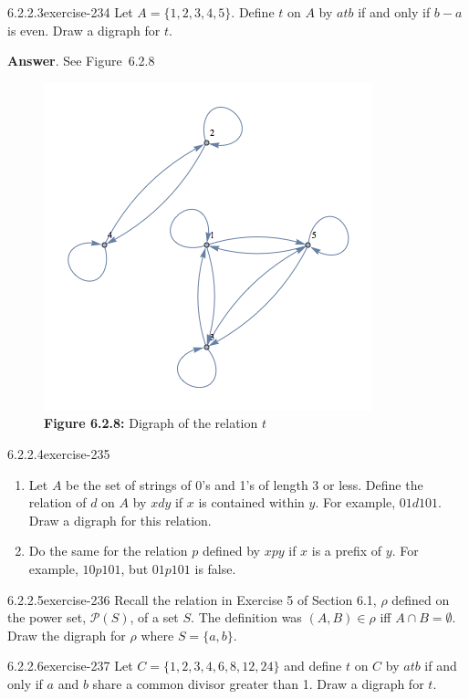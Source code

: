 \documentclass[twoside,10pt,]{book}
\numberwithin{equation}{section}
\begin{document}
\begin{divisionsolution}{6.2.2.3}{}{exercise-234}%
\hypertarget{p-1994}{}%
Let \(A=\{1,2,3,4,5\}\). Define \(t\) on \(A\) by \(a t b\) if and only if \(b - a\) is even. Draw a digraph for \(t\).%
\par\smallskip%
\noindent\textbf{Answer}.\quad%
\hypertarget{p-1995}{}%
See Figure~6.2.8%
\begin{figure}
\centering
\includegraphics[width=0.6\linewidth]{images/fig-13-1-1.png}
\caption*{\textbf{Figure 6.2.8:} Digraph of the relation \(t\)}
\end{figure}
\end{divisionsolution}%
\begin{divisionsolution}{6.2.2.4}{}{exercise-235}%
\hypertarget{p-1996}{}%
\leavevmode%
\begin{enumerate}[label=(\alph*)]
\item\hypertarget{li-1059}{}Let \(A\) be the set of strings of 0's and 1's of length 3 or less. Define the relation of \(d\) on \(A\) by \(x d y\) if \(x\) is contained within \(y\). For example, \(01 d 101\). Draw a digraph for this relation.%
\item\hypertarget{li-1060}{}Do the same for the relation \(p\) defined by \(x p y\) if \(x\) is a prefix of \(y\). For example, \(10 p 101\), but \(01 p 101\) is false.%
\end{enumerate}
%
\end{divisionsolution}%
\begin{divisionsolution}{6.2.2.5}{}{exercise-236}%
\hypertarget{p-1997}{}%
Recall the relation in Exercise 5 of Section 6.1, \(\rho\) defined on the power set, \(\mathcal{P}(S)\), of a set \(S\). The definition was \((A,B) \in \rho\) iff \(A\cap  B = \emptyset\). Draw the digraph for \(\rho\) where \(S = \{a, b\}\).%
\end{divisionsolution}%
\begin{divisionsolution}{6.2.2.6}{}{exercise-237}%
\hypertarget{p-1998}{}%
Let \(C= \{1,2, 3, 4, 6, 8, 12, 24\}\) and define \(t\) on \(C\) by \(a t b\) if and only if \(a\) and \(b\) share a common divisor greater than 1.  Draw a digraph for \(t\).%
\end{divisionsolution}%
\end{document}
